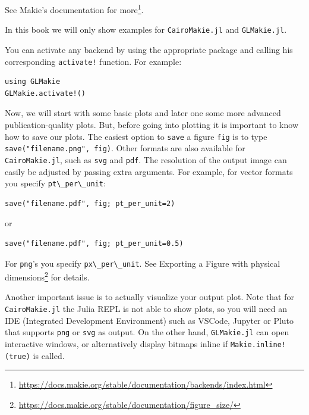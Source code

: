 \documentclass[
  notoc %
]{tufte-book}
\DeclareRobustCommand{\href}[2]{#2\footnote{\url{#1}}}
\newcommand{\passthrough}[1]{#1}
\begin{document}
\href{https://docs.makie.org/stable/documentation/backends/index.html}{See
Makie's documentation for more}.

In this book we will only show examples for
\passthrough{\lstinline!CairoMakie.jl!} and
\passthrough{\lstinline!GLMakie.jl!}.

You can activate any backend by using the appropriate package and
calling his corresponding \passthrough{\lstinline"activate!"} function.
For example:

\begin{lstlisting}
using GLMakie
GLMakie.activate!()
\end{lstlisting}

Now, we will start with some basic plots and later one some more
advanced publication-quality plots. But, before going into plotting it
is important to know how to save our plots. The easiest option to
\passthrough{\lstinline!save!} a figure \passthrough{\lstinline!fig!} is
to type \passthrough{\lstinline!save("filename.png", fig)!}. Other
formats are also available for \passthrough{\lstinline!CairoMakie.jl!},
such as \passthrough{\lstinline!svg!} and \passthrough{\lstinline!pdf!}.
The resolution of the output image can easily be adjusted by passing
extra arguments. For example, for vector formats you specify
\passthrough{\lstinline!pt\_per\_unit!}:

\begin{lstlisting}
save("filename.pdf", fig; pt_per_unit=2)
\end{lstlisting}

or

\begin{lstlisting}
save("filename.pdf", fig; pt_per_unit=0.5)
\end{lstlisting}

For \passthrough{\lstinline!png!}'s you specify
\passthrough{\lstinline!px\_per\_unit!}. See
\href{https://docs.makie.org/stable/documentation/figure_size/}{Exporting
a Figure with physical dimensions} for details.

Another important issue is to actually visualize your output plot. Note
that for \passthrough{\lstinline!CairoMakie.jl!} the Julia REPL is not
able to show plots, so you will need an IDE (Integrated Development
Environment) such as VSCode, Jupyter or Pluto that supports
\passthrough{\lstinline!png!} or \passthrough{\lstinline!svg!} as
output. On the other hand, \passthrough{\lstinline!GLMakie.jl!} can open
interactive windows, or alternatively display bitmaps inline if
\passthrough{\lstinline"Makie.inline!(true)"} is called.
\end{document}
